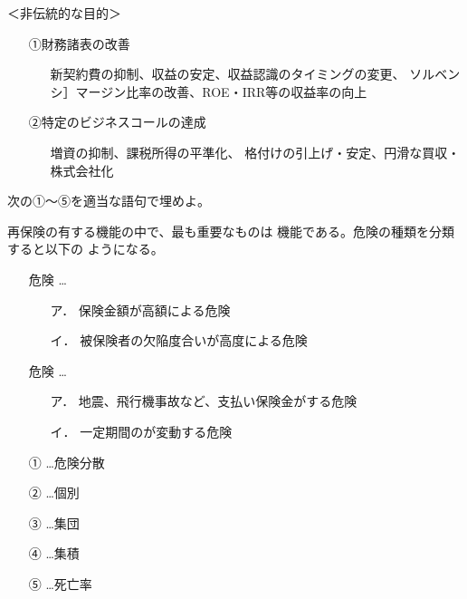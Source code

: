\documentclass[report,gutter=10mm,fore-edge=10mm,uplatex,dvipdfmx]{jlreq}
\begin{document}
\noindent ＜非伝統的な目的＞
\begin{itemize}
\item[]
①財務諸表の改善
\begin{itemize}
\item[]
新契約費の抑制、収益の安定、収益認識のタイミングの変更、
ソルベンシ］マージン比率の改善、ROE・IRR等の収益率の向上
\end{itemize}
\item[]
②特定のビジネスコールの達成
\begin{itemize}
\item[]
増資の抑制、課税所得の平準化、
格付けの引上げ・安定、円滑な買収・株式会社化
\end{itemize}
\end{itemize}

次の①～⑤を適当な語句で埋めよ。

再保険の有する機能の中で、最も重要なものは
機能である。危険の種類を分類すると以下の
ようになる。

\begin{itemize}
\item[] 危険 …
\begin{itemize}
\item[ア．] 保険金額が高額による危険
\item[イ．]  被保険者の欠陥度合いが高度による危険
\end{itemize}

\item[] 危険 …
\begin{itemize}
\item[ア．]  地震、飛行機事故など、支払い保険金がする危険
\item[イ．]  一定期間のが変動する危険
\end{itemize}
\end{itemize}

\answer{}
\begin{itemize}
\item[ ①] …危険分散
\item[ ②] …個別
\item[ ③] …集団
\item[ ④] …集積
\item[ ⑤] …死亡率
\end{itemize}
\end{document}
